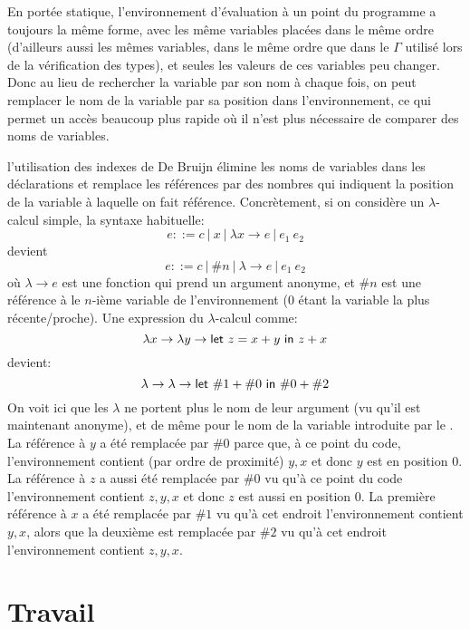 \documentclass{article}
\begin{document}
En portée statique, l'environnement d'évaluation à un point du programme
a toujours la même forme, avec les même variables placées dans le même ordre
(d'ailleurs aussi les mêmes variables, dans le même ordre que dans le $\Gamma$
utilisé lors de la vérification des types), et seules les valeurs de ces
variables peu changer.  Donc au lieu de rechercher la variable par son nom
à chaque fois, on peut remplacer le nom de la variable par sa position dans
l'environnement, ce qui permet un accès beaucoup plus rapide où il n'est
plus nécessaire de comparer des noms de variables.

l'utilisation des indexes de De Bruijn élimine les noms de variables dans
les déclarations et remplace les références par des nombres qui indiquent la
position de la variable à laquelle on fait référence.  Concrètement, si on
considère un $\lambda$-calcul simple, la syntaxe habituelle:
\begin{displaymath}
  e ::=  c ~|~ x ~|~ \lambda x \to e ~|~ e_1~e_2
\end{displaymath}
devient
\begin{displaymath}
  e ::=  c ~|~ \#n ~|~ \lambda \to e ~|~ e_1~e_2
\end{displaymath}
où $\lambda \to e$ est une fonction qui prend un argument anonyme, et $\#n$ est une
référence à le $n$-ième variable de l'environnement (0 étant la variable la
plus récente/proche).
Une expression du $\lambda$-calcul comme:
\begin{displaymath}
  \lambda x \to \lambda y \to \textsf{let}~z = x + y~\textsf{in}~z + x
\end{displaymath}
devient:
\begin{displaymath}
  \lambda \to \lambda \to \textsf{let}~\#1 + \#0~\textsf{in}~\#0 + \#2
\end{displaymath}
On voit ici que les $\lambda$ ne portent plus le nom de leur argument (vu qu'il
est maintenant anonyme), et de même pour le nom de la variable introduite
par le .  La référence à $y$ a été remplacée par $\#0$ parce que,
à ce point du code, l'environnement contient (par ordre de proximité) $y,
x$ et donc $y$ est en position 0.  La référence à $z$ a aussi été remplacée
par $\#0$ vu qu'à ce point du code l'environnement contient $z, y, x$ et
donc $z$ est aussi en position 0.  La première référence à $x$ a été
remplacée par $\#1$ vu qu'à cet endroit l'environnement contient $y,x$,
alors que la deuxième est remplacée par $\#2$ vu qu'à cet endroit
l'environnement contient $z,y,x$.

\section{Travail}
\end{document}
